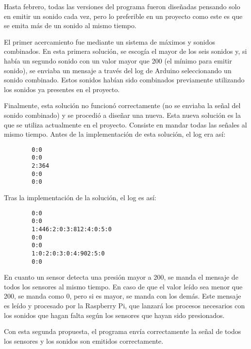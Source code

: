         Hasta febrero, todas las versiones del programa fueron diseñadas pensando solo en emitir un sonido cada vez,
        pero lo preferible en un proyecto como este es que se emita más de un sonido al mismo tiempo.\newline

        El primer acercamiento fue mediante un sistema de máximos y sonidos combinados. En esta primera solución, se
        escogía el mayor de los seis sonidos y, si había un segundo sonido con un valor mayor que 200 (el mínimo para
        emitir sonido), se enviaba un mensaje a través del log de Arduino seleccionando un sonido combinado. Estos
        sonidos habían sido combinados previamente utilizando los sonidos ya presentes en el proyecto.\newline

        Finalmente, esta solución no funcionó correctamente (no se enviaba la señal del sonido combinado) y se procedió
        a diseñar una nueva. Esta nueva solución es la que se utiliza actualmente en el proyecto. Consiste en mandar
        todas las señales al mismo tiempo. Antes de la implementación de esta solución, el log era así:

        \begin{verbatim}
        0:0
        0:0
        2:364
        0:0
        0:0
        \end{verbatim}

        Tras la implementación de la solución, el log es así:

        \begin{verbatim}
        0:0
        0:0
        1:446:2:0:3:812:4:0:5:0
        0:0
        0:0
        1:0:2:0:3:0:4:902:5:0
        0:0
        \end{verbatim}

        En cuanto un sensor detecta una presión mayor a 200, se manda el mensaje de todos los sensores al mismo tiempo.
        En caso de que el valor leído sea menor que 200, se manda como 0, pero si es mayor, se manda con los demás. Este
        mensaje es leído y procesado por la Raspberry Pi, que lanzará los procesos necesarios con los sonidos que hagan
        falta según los sensores que hayan sido presionados.\newline

        Con esta segunda propuesta, el programa envía correctamente la señal de todos los sensores y los sonidos son
        emitidos correctamente.


